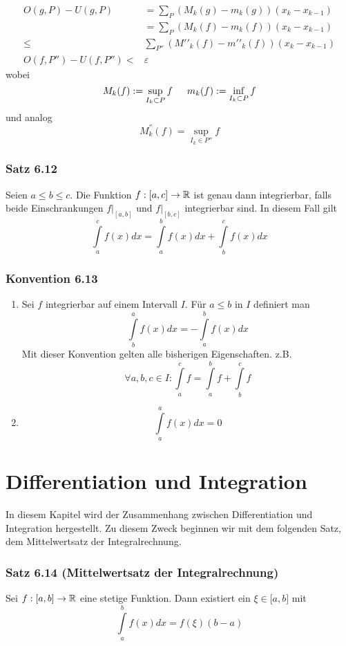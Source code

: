\begin{align*}
O(g,P) - U(g,P) &=\sum\limits_P {({M_k}(g) - {m_k}(g))({x_k} - {x_{k - 1}})} \\
&=\sum\limits_P {({M_k}(f) - {m_k}(f))({x_k} - {x_{k - 1}})} \\
\le&\sum\limits_{P''} {(M'{'_k}(f) - m'{'_k}(f))({x_k} - {x_{k - 1}})} \\
O(f,P'')-U(f,P'')<& \varepsilon
\end{align*}
wobei
\[{M_k}(f): = \mathop {\sup }\limits_{{I_k} \subset P} f\text{\indent}{m_k}(f): = \mathop {\inf }\limits_{{I_k} \subset P} f\]
und analog
\[M^{''}_{k}\left( f\right) =\sup _{I_k\in P''}f\]

\subsubsection*{Satz 6.12}
Seien $a\leq b\leq c$. Die Funktion $f:\lbrack a,c\rbrack\to\mathbb{R}$ ist genau dann integrierbar, falls beide Einschrankungen ${\left. f \right|_{[a,b]}}$ und ${\left. f \right|_{[b,c]}}$ integrierbar sind. In diesem Fall gilt \[\int\limits_a^c {f(x)dx = \int\limits_a^b {f(x)dx + \int\limits_b^c {f(x)dx} } } \]
\subsubsection*{Konvention 6.13}
\begin{enumerate}[\indent 1)]
\item Sei $f$ integrierbar auf einem Intervall $I$. Für $a\leq b$ in $I$ definiert man \[\int\limits_b^a {f(x)dx =  - \int\limits_a^b {f(x)dx} } \]
Mit dieser Konvention gelten alle bisherigen Eigenschaften. z.B. \[\forall a,b,c \in I:\int\limits_a^c f  = \int\limits_a^b f  + \int\limits_b^c f \]
\item \[\int\limits_a^a {f(x)dx = 0} \]
\end{enumerate}
\section{Differentiation und Integration}
In diesem Kapitel wird der Zusammenhang zwischen Differentiation und Integration hergestellt. Zu diesem Zweck beginnen wir mit dem folgenden Satz, dem Mittelwertsatz der Integralrechnung. \\

\subsubsection*{Satz 6.14 (Mittelwertsatz der Integralrechnung)}
Sei $f:\lbrack a,b\rbrack\to\mathbb{R}$ eine stetige Funktion. Dann existiert ein $\xi\in\lbrack a,b\rbrack$ mit \[\int\limits_a^b {f(x)dx = f(\xi )(b - a)} \]

